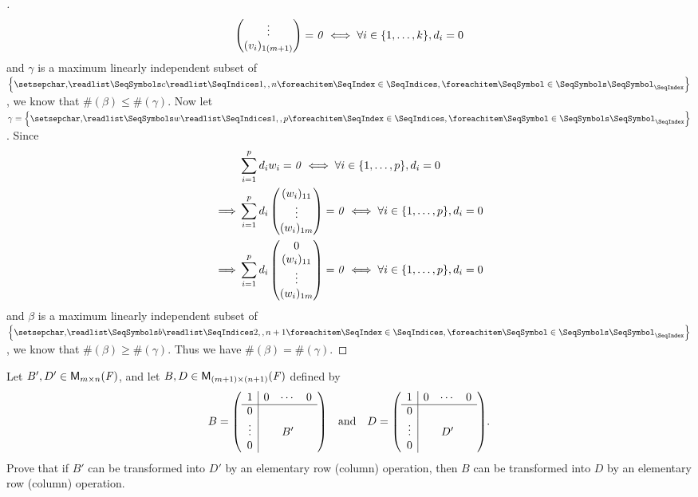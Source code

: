 \begin{proof}[]
\begin{align*}
\begin{pmatrix}
			                              \vdots      \\
			                              (v_i)_{1 (m + 1)}
		                              \end{pmatrix} = \zv \iff \forall i \in \set{1, \dots, k}, d_i = 0
	\end{align*}
	and \(\gamma\) is a maximum linearly independent subset of \(\set{\seq{c}{1,,n}}\), we know that \(\#(\beta) \leq \#(\gamma)\).
	Now let \(\gamma = \set{\seq{w}{1,,p}}\).
	Since
	\begin{align*}
		         & \sum_{i = 1}^p d_i w_i = \zv \iff \forall i \in \set{1, \dots, p}, d_i = 0           \\
		\implies & \sum_{i = 1}^p d_i \begin{pmatrix}
			                              (w_i)_{1 1} \\
			                              \vdots      \\
			                              (w_i)_{1 m}
		                              \end{pmatrix} = \zv \iff \forall i \in \set{1, \dots, p}, d_i = 0 \\
		\implies & \sum_{i = 1}^p d_i \begin{pmatrix}
			                              0           \\
			                              (w_i)_{1 1} \\
			                              \vdots      \\
			                              (w_i)_{1 m}
		                              \end{pmatrix} = \zv \iff \forall i \in \set{1, \dots, p}, d_i = 0 \\
	\end{align*}
	and \(\beta\) is a maximum linearly independent subset of \(\set{\seq{b}{2,,n+1}}\), we know that \(\#(\beta) \geq \#(\gamma)\).
	Thus we have \(\#(\beta) = \#(\gamma)\).
\end{proof}

\begin{ex}\label{ex:3.2.12}
	Let \(B', D' \in \ms\), and let \(B, D \in \ms[(m + 1)][(n + 1)][\F]\) defined by
	\[
		B = \pa{\begin{array}{c|ccc}
				1      & 0 & \cdots & 0 \\
				\hline
				0      &   &        &   \\
				\vdots &   & B'     &   \\
				0      &   &        &
			\end{array}} \quad \text{and} \quad D = \pa{\begin{array}{c|ccc}
				1      & 0 & \cdots & 0 \\
				\hline
				0      &   &        &   \\
				\vdots &   & D'     &   \\
				0      &   &        &
			\end{array}}.
	\]
	Prove that if \(B'\) can be transformed into \(D'\) by an elementary row (column) operation, then \(B\) can be transformed into \(D\) by an elementary row (column) operation.
\end{ex}


